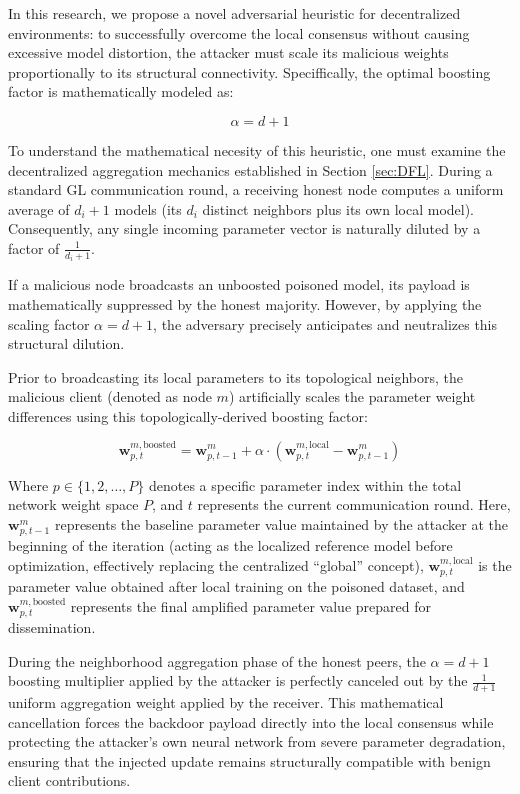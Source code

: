 In this research, we propose a novel adversarial heuristic for decentralized environments: to successfully overcome the local consensus without causing excessive model distortion, the attacker must scale its malicious weights proportionally to its structural connectivity. Speciffically, the optimal boosting factor is mathematically modeled as:

\begin{equation}
    \alpha = d + 1
\end{equation}

To understand the mathematical necesity of this heuristic, one must examine the decentralized aggregation mechanics established in Section \ref{sec:DFL}. During a standard GL communication round, a receiving honest node computes a uniform average of $d_i + 1$ models (its $d_i$ distinct neighbors plus its own local model). Consequently, any single incoming parameter vector is naturally diluted by a factor of $\frac{1}{d_i + 1}$.

If a malicious node broadcasts an unboosted poisoned model, its payload is mathematically suppressed by the honest majority. However, by applying the scaling factor $\alpha = d + 1$, the adversary precisely anticipates and neutralizes this structural dilution.

Prior to broadcasting its local parameters to its topological neighbors, the malicious client (denoted as node $m$) artificially scales the parameter weight differences using this topologically-derived boosting factor:

\begin{equation}
    \mathbf{w}_{p, t}^{m, \text{boosted}} = \mathbf{w}_{p, t-1}^{m} + \alpha \cdot \left(\mathbf{w}_{p, t}^{m, \text{local}} - \mathbf{w}_{p, t-1}^{m}\right)
\end{equation}

Where $p \in \{1, 2, \dots, P\}$ denotes a specific parameter index within the total network weight space $P$, and $t$ represents the current communication round. Here, $\mathbf{w}_{p, t-1}^{m}$ represents the baseline parameter value maintained by the attacker at the beginning of the iteration (acting as the localized reference model before optimization, effectively replacing the centralized ``global'' concept), $\mathbf{w}_{p, t}^{m, \text{local}}$ is the parameter value obtained after local training on the poisoned dataset, and $\mathbf{w}_{p, t}^{m, \text{boosted}}$ represents the final amplified parameter value prepared for dissemination.

During the neighborhood aggregation phase of the honest peers, the $\alpha = d + 1$ boosting multiplier applied by the attacker is perfectly canceled out by the $\frac{1}{d+1}$ uniform aggregation weight applied by the receiver. This mathematical cancellation forces the backdoor payload directly into the local consensus while protecting the attacker's own neural network from severe parameter degradation, ensuring that the injected update remains structurally compatible with benign client contributions.

